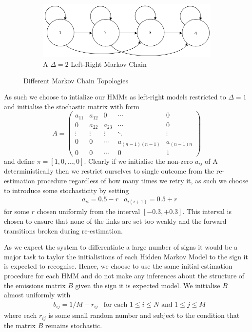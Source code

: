 \begin{figure} [h!]
\begin{subfigure}[b]{0.5\textwidth}
                \label{fig:clust}
        \end{subfigure}
	   \begin{subfigure}[b]{0.5\textwidth}
                \centering
                \includegraphics[width=1.0\textwidth]{ThesisFigs/del2LRMC}
                \caption{A $\Delta = 2$ Left-Right Markov Chain}
                \label{fig:clust}
        \end{subfigure}
        \caption{Different Markov Chain Topologies}\label{fig:mctop}
\end{figure}

As such we choose to intialize our HMMs as left-right models restricted to $\Delta = 1$ and initialise the stochastic matrix with form
\begin{equation*}
A =
 \begin{pmatrix}
  a_{11} & a_{12} & 0 & \cdots & 0 \\
  0 & a_{22} & a_{23} &\cdots & 0 \\
  \vdots  & \vdots  & \vdots & \ddots & \vdots  \\
  0 & 0 & \cdots & a_{(n-1)(n-1)}& a_{(n-1)n} \\
  0 & 0 & \cdots & 0& 1
 \end{pmatrix}
\end{equation*}
and define $\pi = [1,0, \dots, 0]$. Clearly if we initialise the non-zero $a_{ij}$ of A deterministically then we restrict ourselves to single outcome from the re-estimation procedure regardless of how many times we retry it, as such we choose to introduce some stochasticity by setting
\begin{align*}
&a_{ii} = 0.5 - r &a_{i(i+1)} = 0.5 + r
\end{align*}
 for some $r$ chosen uniformly from the interval $[-0.3, +0.3]$. This interval is chosen to ensure that none of the links are set too weakly and the forward transitions broken during re-estimation.

As we expect the system to differentiate a large number of signs it would be a major task to taylor the initialistions of each Hidden Markov Model to the sign it is expected to recognise. Hence, we choose to use the same initial estimation procedure for each HMM and do not make any inferences about the structure of the emissions matrix $B$ given the sign it is expected model. We initialise $B$ almost uniformly with
\begin{align*}
&b_{ij} = 1/M + r_{ij} &\text{for each $1\leq i \leq N$ and $1 \leq j \leq M$}
\end{align*}
where each $r_{ij}$ is some small random number and subject to the condition that the matrix $B$ remains stochastic.

